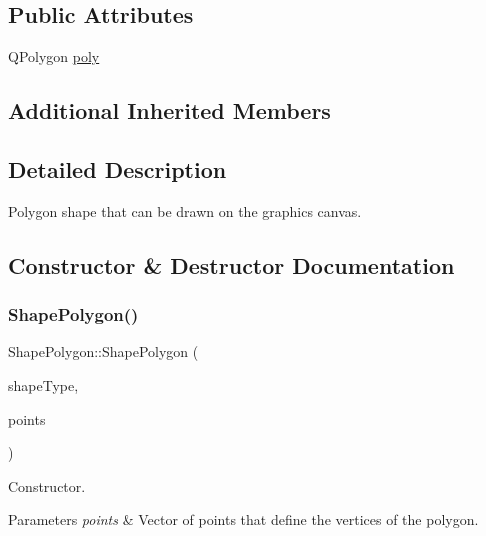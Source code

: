 \subsection*{Public Attributes}
\begin{DoxyCompactItemize}
\item 
Q\+Polygon \mbox{\hyperlink{class_shape_polygon_a28be8d33f69f3e0e895acd9d574a814f}{poly}}
\end{DoxyCompactItemize}
\subsection*{Additional Inherited Members}


\subsection{Detailed Description}
Polygon shape that can be drawn on the graphics canvas. 



\subsection{Constructor \& Destructor Documentation}
\mbox{\label{class_shape_polygon_a885cea7a439a995f1ec5dc966abaa889}} 
\subsubsection{\texorpdfstring{ShapePolygon()}{ShapePolygon()}\hspace{0.1cm}{\footnotesize\ttfamily [1/2]}}
{\footnotesize\ttfamily Shape\+Polygon\+::\+Shape\+Polygon (\begin{DoxyParamCaption}\item[{const \mbox{\hyperlink{class_i_shape_a8f50993477b5ddb44c0547ef3d547cdc}{Shape\+Type}}}]{shape\+Type,  }\item[{const Q\+Vector$<$ Q\+Point $>$ \&}]{points }\end{DoxyParamCaption})}



Constructor. 


\begin{DoxyParams}{Parameters}
{\em points} & Vector of points that define the vertices of the polygon. \\
\hline
\end{DoxyParams}
\mbox{\label{class_shape_polygon_a51d433edd43f608acce1fae81e5583d5}} 

